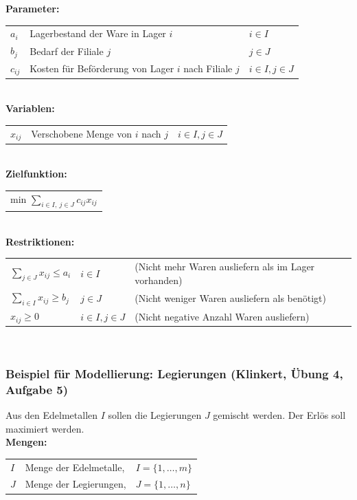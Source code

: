   \textbf{Parameter:}\\
  \begin{tabular}{lll}
    $a_{i}$ & Lagerbestand der Ware in Lager $i$& $i \in I$ \\
    $b_j$   & Bedarf der Filiale $j$& $j \in J$\\
    $c_{ij}$& Kosten für Beförderung von Lager $i$ nach Filiale $j$& $i \in I, j \in J$\\
  \end{tabular}\\
  
  \textbf{Variablen:}\\
  \begin{tabular}{lll}
    $x_{ij}$ & Verschobene Menge von $i$ nach $j$ & $i \in I, j \in J$\\
  \end{tabular}\\
  
  \textbf{Zielfunktion:}\\
  \begin{tabular}{l}
    min $\sum\limits_{i \in I,~j \in J}c_{ij} x_{ij}$\\
  \end{tabular}\\
  
  \textbf{Restriktionen:}\\
  \begin{tabular}{lll}
    $\sum\limits_{j \in J}x_{ij}\leq a_{i}$ & $i \in I$          & (Nicht mehr Waren ausliefern als im Lager vorhanden)\\
    $\sum\limits_{i \in I}x_{ij}\geq b_{j}$ & $j \in J$          & (Nicht weniger Waren ausliefern als benötigt)\\
    $x_{ij} \ge 0$                          & $i \in I, j \in J$ & (Nicht negative Anzahl Waren ausliefern)\\
  \end{tabular}\\
  
  \subsubsection{Beispiel für Modellierung: Legierungen (Klinkert, Übung 4, Aufgabe 5)}
    Aus den Edelmetallen $I$ sollen die Legierungen $J$ gemischt werden. Der Erlös soll maximiert werden.\\
    
    \textbf{Mengen:}\\
    \begin{tabular}{lll}
      $I$ & Menge der Edelmetalle, &$I = \{1, \ldots, m\}$\\
      $J$ & Menge der Legierungen, &$J = \{1, \ldots, n\}$
    \end{tabular}\\

